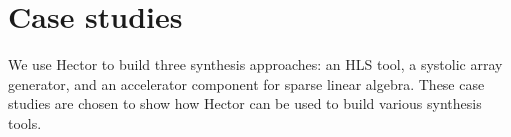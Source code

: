 \documentclass[sigconf]{acmart}
\begin{document}







\newcommand \dsir{\texttt{ToR}\xspace}
\newcommand \fsm{\texttt{HEC}\xspace}
\newcommand \tor{\texttt{ToR}\xspace}
\newcommand \hec{\texttt{HEC}\xspace}

\newcommand*{\rom}[1]{\uppercase\expandafter{\romannumeral #1\relax}}





\maketitle



% 


% 
% 
\section{Case studies}
We use Hector to build three synthesis approaches: an HLS tool, a systolic array generator, and an accelerator component for sparse linear algebra. These case studies are chosen to show how Hector can be used to build various synthesis tools. %
\end{document}

